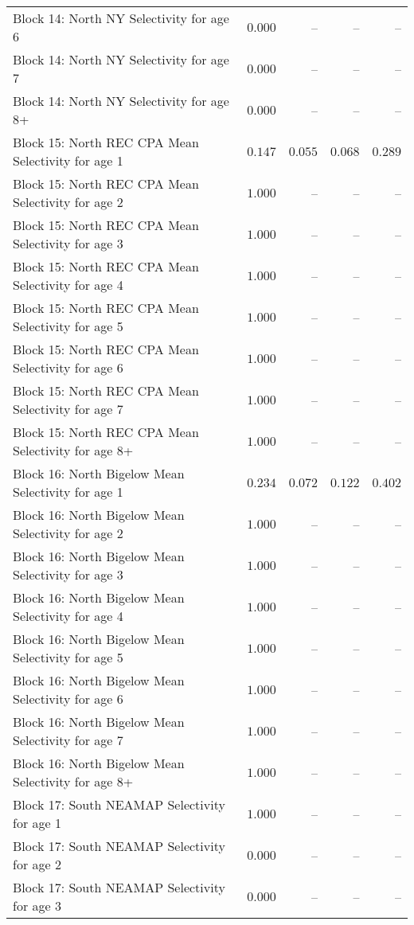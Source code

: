\documentclass[
]{article}
\begin{document}
\begin{landscape}
\begin{longtable}[t]{lrrrr}
\addlinespace
Block 14: North NY Selectivity for age 6 & $0.000$ & -- & -- & --\\
Block 14: North NY Selectivity for age 7 & $0.000$ & -- & -- & --\\
Block 14: North NY Selectivity for age 8+ & $0.000$ & -- & -- & --\\
Block 15: North REC CPA Mean Selectivity for age 1 & $0.147$ & $0.055$ & $0.068$ & $0.289$\\
Block 15: North REC CPA Mean Selectivity for age 2 & $1.000$ & -- & -- & --\\
\addlinespace
Block 15: North REC CPA Mean Selectivity for age 3 & $1.000$ & -- & -- & --\\
Block 15: North REC CPA Mean Selectivity for age 4 & $1.000$ & -- & -- & --\\
Block 15: North REC CPA Mean Selectivity for age 5 & $1.000$ & -- & -- & --\\
Block 15: North REC CPA Mean Selectivity for age 6 & $1.000$ & -- & -- & --\\
Block 15: North REC CPA Mean Selectivity for age 7 & $1.000$ & -- & -- & --\\
\addlinespace
Block 15: North REC CPA Mean Selectivity for age 8+ & $1.000$ & -- & -- & --\\
Block 16: North Bigelow Mean Selectivity for age 1 & $0.234$ & $0.072$ & $0.122$ & $0.402$\\
Block 16: North Bigelow Mean Selectivity for age 2 & $1.000$ & -- & -- & --\\
Block 16: North Bigelow Mean Selectivity for age 3 & $1.000$ & -- & -- & --\\
Block 16: North Bigelow Mean Selectivity for age 4 & $1.000$ & -- & -- & --\\
\addlinespace
Block 16: North Bigelow Mean Selectivity for age 5 & $1.000$ & -- & -- & --\\
Block 16: North Bigelow Mean Selectivity for age 6 & $1.000$ & -- & -- & --\\
Block 16: North Bigelow Mean Selectivity for age 7 & $1.000$ & -- & -- & --\\
Block 16: North Bigelow Mean Selectivity for age 8+ & $1.000$ & -- & -- & --\\
Block 17: South NEAMAP Selectivity for age 1 & $1.000$ & -- & -- & --\\
\addlinespace
Block 17: South NEAMAP Selectivity for age 2 & $0.000$ & -- & -- & --\\
Block 17: South NEAMAP Selectivity for age 3 & $0.000$ & -- & -- & --\\

\end{longtable}
\end{landscape}
\end{document}
